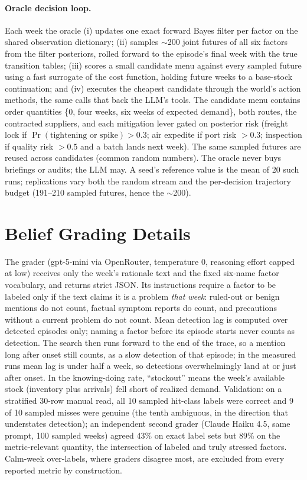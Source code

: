 \documentclass{article}
\begin{document}
\paragraph{Oracle decision loop.} Each week the oracle (i) updates one exact
forward Bayes filter per factor on the shared observation dictionary;
(ii) samples $\sim$200 joint futures of all six factors from the filter
posteriors, rolled forward to the episode's final week with the true
transition tables; (iii) scores a
small candidate menu against every sampled future using a fast surrogate of
the cost function, holding future weeks to a base-stock continuation; and
(iv) executes the cheapest candidate through the world's action methods,
the same calls that back the LLM's tools. The candidate menu contains order quantities \{0, four weeks, six
weeks of expected demand\}, both routes, the contracted suppliers, and each
mitigation lever gated on posterior risk (freight lock if
$\Pr(\text{tightening or spike}) > 0.3$; air expedite if port risk $> 0.3$;
inspection if quality risk $> 0.5$ and a batch lands next week). The same
sampled futures are reused across candidates (common random numbers). The
oracle never buys briefings or audits; the LLM may. A seed's reference
value is the mean of 20 such runs; replications vary both the random
stream and the per-decision trajectory budget (191--210 sampled futures,
hence the $\sim$200).

\section{Belief Grading Details}
\label{app:grading}

The grader (gpt-5-mini via OpenRouter, temperature 0, reasoning effort
capped at low) receives only the week's rationale text and the fixed
six-name factor vocabulary, and returns strict JSON. Its instructions require a
factor to be labeled only if the text claims it is a problem \emph{that
week}: ruled-out or benign mentions do not count, factual symptom reports do
count, and precautions without a current problem do not count. Mean
detection lag is computed over detected episodes only; naming a factor
before its episode starts never counts as detection. The search then runs
forward to the end of the trace, so a mention long after onset still
counts, as a slow detection of that episode; in the measured runs mean lag
is under half a week, so detections overwhelmingly land at or just after
onset. In the knowing-doing
rate, ``stockout'' means the week's available stock (inventory plus
arrivals) fell short of realized demand. Validation: on a stratified 30-row
manual read, all 10 sampled hit-class labels were correct and 9 of 10
sampled misses were genuine (the tenth ambiguous, in the direction that
understates detection); an independent second grader (Claude Haiku 4.5, same
prompt, 100 sampled weeks) agreed 43\% on exact label sets but 89\% on the
metric-relevant quantity, the intersection of labeled and truly stressed
factors. Calm-week over-labels, where graders disagree most, are excluded
from every reported metric by construction.
\end{document}

